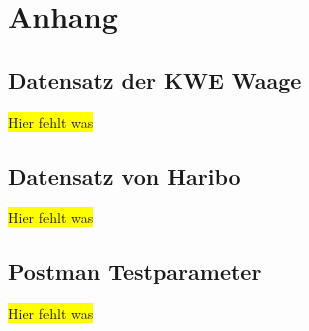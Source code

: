 \chapter{Anhang}
\label{ch:anhang}

\section{Datensatz der KWE Waage}
\label{sec:scaleData}
\colorbox{yellow}{Hier fehlt was}

\section{Datensatz von Haribo}
\label{sec:hariboData}
\colorbox{yellow}{Hier fehlt was}

\section{Postman Testparameter}
\label{sec:postmanTestparameter}
\colorbox{yellow}{Hier fehlt was}